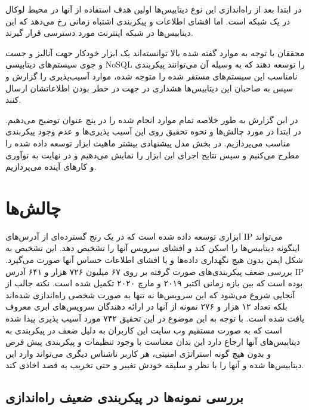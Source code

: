 \documentclass[10pt, a4paper]{article}
\begin{document}
در ابتدا بعد از راه‌اندازی این نوع دیتابیس‌ها اولین هدف استفاده از آنها در محیط
لوکال در یک شبکه است. اما افشای اطلاعات و پیکربندی اشتباه زمانی رخ می‌دهد که این
دیتابیس‌ها در شبکه اینترنت مورد دسترسی قرار گیرند.

محققان با توجه به موارد گفته شده بالا توانسته‌اند یک ابزار خودکار جهت آنالیز و
جست و جوی سیستم‌های دیتابیسی NoSQL را توسعه دهند که به وسیله آن می‌توانند
پیکربندی نامناسب این سیستم‌های مستقر شده را متوجه شده، موارد آسیب‌پذیری را گزارش
و سپس به صاحبان این دیتابیس‌ها هشداری در جهت در خطر بودن اطلاعاتشان ارسال کنند.

در این گزارش به طور خلاصه تمام موارد انجام شده را در پنج عنوان توضیح می‌دهیم. در
ابتدا در مورد چالش‌ها و نحوه تحقیق روی این آسیب پذیری‌ها و عدم وجود پیکربندی
مناسب می‌پردازیم. در بخش مدل پیشنهادی بیشتر ماهیت ابزار توسعه داده شده را مطرح
می‌کنیم و سپس نتایج اجرای این ابزار را نمایش می‌دهیم و در نهایت به نوآوری و
کار‌های آینده می‌پردازیم.

\newpage

\section{چالش‌ها}

ابزاری توسعه داده شده است که در یک رنج گسترده‌ای از آدرس‌های IP می‌تواند اینگونه
دیتابیس‌ها را اسکن کند و افشای سرویس آنها را تشخیص دهد. این تشخیص به شکل ایمن
بدون هیچ نگهداری داده‌ها و یا افشای اطلاعات حساس آنها صورت می‌گیرد. بررسی ضعف
پیکربندی‌های صورت گرفته بر روی ۶۷ میلیون ۷۲۶ هزار و ۶۴۱ آدرس IP بوده است که بین
بازه زمانی اکتبر ۲۰۱۹ و مارچ ۲۰۲۰ تکمیل شده است. نکته جالب از آنجایی شروع می‌شود
که این سرویس‌ها نه تنها به صورت شخصی راه‌اندازی شده‌اند بلکه تعداد ۱۲ هزار و ۲۷۶
نمونه از آنها در ارائه دهندگان سرویس‌های ابری معروف یافت شده است.  با توجه به
این موضوع در این تحقیق ۷۴۲ مورد آسیب پذیری پیدا شده است که به صورت مستقیم وب
سایت این کاربران به دلیل ضعف در پیکربندی به دیتابیس‌های آنها ارجاع دارد این بدان
معناست با وجود تنظیمات و پیکربندی پیش فرض و بدون هیچ گونه استراتژی امنیتی، هر
کاربر ناشناس دیگری می‌تواند وارد این دیتابیس‌ها شده و آنها را با نظر و سلیقه
خودش تغییر و حتی تخریب به قصد اخاذی کند.

\subsection{بررسی نمونه‌ها در پیکربندی ضعیف راه‌اندازی}
\end{document}
